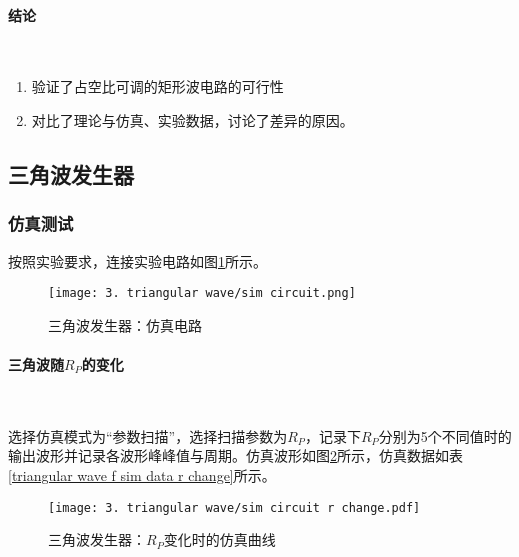 \documentclass[UTF8]{ctexart}
\numberwithin{figure}{subsection}
\numberwithin{table}{subsection}
\numberwithin{equation}{subsection}
\begin{document}
\paragraph{结论}~{}
\par 
\begin{enumerate}
    \item 验证了占空比可调的矩形波电路的可行性
    \item 对比了理论与仿真、实验数据，讨论了差异的原因。
\end{enumerate}

\subsection{三角波发生器}
\subsubsection{仿真测试}

\par 按照实验要求，连接实验电路如图\ref{triangular wave sim circuit}所示。

\begin{figure}[H]
    \begin{center}
        \caption{三角波发生器：仿真电路}
        \texttt{[image: 3. triangular wave/sim circuit.png]}
        \label{triangular wave sim circuit}
    \end{center}
\end{figure}

\paragraph{三角波随\(R_P\)的变化}~{}
\par 选择仿真模式为“参数扫描”，选择扫描参数为\(R_P\)，记录下\(R_P\)分别为5个不同值时的输出波形并记录各波形峰峰值与周期。仿真波形如图\ref{triangular sim curve r change}所示，仿真数据如表\ref{triangular wave f sim data r change}所示。

\begin{figure}[H]
    \begin{center}
        \caption{三角波发生器：\(R_P\)变化时的仿真曲线}
        \texttt{[image: 3. triangular wave/sim circuit r change.pdf]}
        \label{triangular sim curve r change}
    \end{center}
\end{figure}
\end{document}
